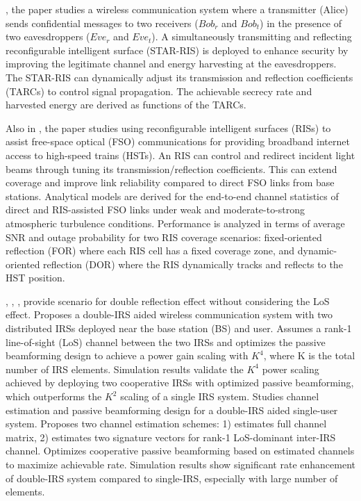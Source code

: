\documentclass{article}
\begin{document}
\par \cite{6}, the paper studies a wireless communication system where a transmitter (Alice) sends confidential messages to two receivers ($Bob_r$ and $Bob_t$) in the presence of two eavesdroppers ($Eve_r$ and $Eve_t$). A simultaneously transmitting and reflecting reconfigurable intelligent surface (STAR-RIS) is deployed to enhance security by improving the legitimate channel and energy harvesting at the eavesdroppers. The STAR-RIS can dynamically adjust its transmission and reflection coefficients (TARCs) to control signal propagation. The achievable secrecy rate and harvested energy are derived as functions of the TARCs.
\par Also in \cite{7}, the paper studies using reconfigurable intelligent surfaces (RISs) to assist free-space optical (FSO) communications for providing broadband internet access to high-speed trains (HSTs).
An RIS can control and redirect incident light beams through tuning its transmission/reflection coefficients. This can extend coverage and improve link reliability compared to direct FSO links from base stations. Analytical models are derived for the end-to-end channel statistics of direct and RIS-assisted FSO links under weak and moderate-to-strong atmospheric turbulence conditions. Performance is analyzed in terms of average SNR and outage probability for two RIS coverage scenarios: fixed-oriented reflection (FOR) where each RIS cell has a fixed coverage zone, and dynamic-oriented reflection (DOR) where the RIS dynamically tracks and reflects to the HST position.
\par \cite{8}, \cite{9}, \cite{10}, \cite{11}  provide scenario for double reflection effect without considering the LoS effect.
\cite{8} Proposes a double-IRS aided wireless communication system with two distributed IRSs deployed near the base station (BS) and user.
Assumes a rank-1 line-of-sight (LoS) channel between the two IRSs and optimizes the passive beamforming design to achieve a power gain scaling with $K^4$, where K is the total number of IRS elements.
Simulation results validate the $K^4$ power scaling achieved by deploying two cooperative IRSs with optimized passive beamforming, which outperforms the $K^2$ scaling of a single IRS system. \cite{9} Studies channel estimation and passive beamforming design for a double-IRS aided single-user system. Proposes two channel estimation schemes: 1) estimates full channel matrix, 2) estimates two signature vectors for rank-1 LoS-dominant inter-IRS channel. Optimizes cooperative passive beamforming based on estimated channels to maximize achievable rate. Simulation results show significant rate enhancement of double-IRS system compared to single-IRS, especially with large number of elements.
\end{document}
